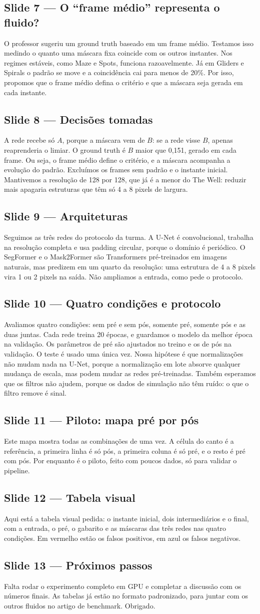 \documentclass[11pt,a4paper]{article}
\newcommand{\slide}[2]{\subsection*{Slide #1 --- #2}}
\begin{document}
\slide{7}{O ``frame médio'' representa o fluido?}
O professor sugeriu um ground truth baseado em um frame médio. Testamos isso medindo o
quanto uma máscara fixa coincide com os outros instantes. Nos regimes estáveis, como Maze
e Spots, funciona razoavelmente. Já em Gliders e Spirals o padrão se move e a coincidência
cai para menos de 20\%. Por isso, propomos que o frame médio defina o critério e que a
máscara seja gerada em cada instante.

\slide{8}{Decisões tomadas}
A rede recebe só $A$, porque a máscara vem de $B$: se a rede visse $B$, apenas reaprenderia o
limiar. O ground truth é $B$ maior que 0,151, gerado em cada frame. Ou seja, o frame médio
define o critério, e a máscara acompanha a evolução do padrão. Excluímos os frames sem padrão e
o instante inicial. Mantivemos a resolução de 128 por 128, que já é a menor do The Well:
reduzir mais apagaria estruturas que têm só 4 a 8 pixels de largura.

\slide{9}{Arquiteturas}
Seguimos as três redes do protocolo da turma. A U-Net é convolucional, trabalha na resolução
completa e usa padding circular, porque o domínio é periódico. O SegFormer e o Mask2Former são
Transformers pré-treinados em imagens naturais, mas predizem em um quarto da resolução: uma
estrutura de 4 a 8 pixels vira 1 ou 2 pixels na saída. Não ampliamos a entrada, como pede o
protocolo.

\slide{10}{Quatro condições e protocolo}
Avaliamos quatro condições: sem pré e sem pós, somente pré, somente pós e as duas juntas. Cada rede
treina 20 épocas, e guardamos o modelo da melhor época na validação. Os parâmetros de pré são
ajustados no treino e os de pós na validação. O teste é usado uma única
vez. Nossa hipótese é que normalizações não mudam nada na U-Net, porque a normalização em lote absorve
qualquer mudança de escala, mas podem mudar as redes pré-treinadas. Também esperamos que os filtros não ajudem, porque os dados
de simulação não têm ruído: o que o filtro remove é sinal.

\slide{11}{Piloto: mapa pré por pós}
Este mapa mostra todas as combinações de uma vez. A célula do canto é a referência, a primeira
linha é só pós, a primeira coluna é só pré, e o resto é pré com pós. Por enquanto é o piloto,
feito com poucos dados, só para validar o pipeline.

\slide{12}{Tabela visual}
Aqui está a tabela visual pedida: o instante inicial, dois intermediários e o final, com a
entrada, o pré, o gabarito e as máscaras das três redes nas quatro condições. Em vermelho
estão os falsos positivos, em azul os falsos negativos.

\slide{13}{Próximos passos}
Falta rodar o experimento completo em GPU e completar a discussão com os números finais. As
tabelas já estão no formato padronizado, para juntar com os outros fluidos no artigo de
benchmark. Obrigado.
\end{document}
